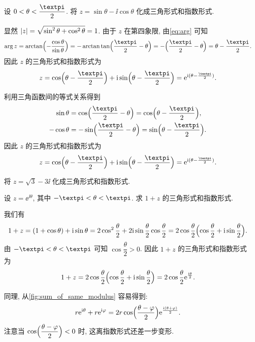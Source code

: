 \begin{example}
  设 $0<\theta<\dfrac\cpi2$.
  将 $z=\sin\theta-\ii\cos\theta$ 化成三角形式和指数形式.
\end{example}

\begin{solution}[解法一]
  显然 $\lvert z\rvert=\sqrt{\sin^2\theta+\cos^2\theta}=1$. 由于 $z$ 在第四象限, 由\eqref{eq:arg} 可知
  \[
     \arg z
    =\arctan\Bigl(-\frac{\cos\theta}{\sin\theta}\Bigr)
    =-\arctan\tan\Bigl(\frac\cpi2-\theta\Bigr)
    =-\Bigl(\frac\cpi2-\theta\Bigr)
    =\theta-\frac\cpi2.
  \]
  因此 $z$ 的三角形式和指数形式为
  \[
     z
    =\cos\Bigl(\theta-\frac\cpi2\Bigr)+\ii\sin\Bigl(\theta-\frac\cpi2\Bigr)
    =\ee^{\ii(\theta-\frac\cpi2)}.
  \]
\end{solution}

\begin{solution}[解法二]
  利用三角函数间的等式关系得到
  \begin{align*}
      \sin\theta
    &=\cos\Bigl(\frac\cpi2-\theta\Bigr)
     =\cos\Bigl(\theta-\frac\cpi2\Bigr),\\
      -\cos\theta
    &=-\sin\Bigl(\frac\cpi2-\theta\Bigr)
     =\sin\Bigl(\theta-\frac\cpi2\Bigr).
  \end{align*}
  因此 $z$ 的三角形式和指数形式为
  \[
     z
    =\cos\Bigl(\theta-\frac\cpi2\Bigr)+\ii\sin\Bigl(\theta-\frac\cpi2\Bigr)
    =\ee^{\ii(\theta-\frac\cpi2)}.
  \]
\end{solution}

\begin{exercise}
  将 $z=\sqrt 3-3\ii$ 化成三角形式和指数形式.
\end{exercise}

\begin{example}
  设 $z=\ee^{\ii\theta}$, 其中 $-\cpi<\theta<\cpi$.
  求 $1+z$ 的三角形式和指数形式.
\end{example}
\begin{solution}
  我们有
  \[
     1+z
    =(1+\cos\theta)+\mathrm{i}\sin\theta
    =2\cos^2\frac\theta2+2\mathrm{i}\sin\frac\theta2\cos\frac\theta2
    =2\cos\frac\theta2\Bigl(\cos\frac\theta2+\mathrm{i}\sin\frac\theta2\Bigr).
  \]
  由 $-\cpi<\theta<\cpi$ 可知 $\cos\dfrac\theta2>0$.
  因此 $1+z$ 的三角形式和指数形式为
  \[
     1+z
    =2\cos\frac\theta2\Bigl(\cos\frac\theta2+\mathrm{i}\sin\frac\theta2\Bigr)
    =2\cos\frac\theta2\mathrm{e}^{\frac{\mathrm{i}\theta}2}.
  \]
\end{solution}

同理, 从\ref{fig:sum_of_same_modulus} 容易得到:
\begin{equation}
  \label{eq:sum-of-same-modulus}
   r\mathrm{e}^{\mathrm{i}\theta}+r\mathrm{e}^{\mathrm{i}\varphi}
  =2r\cos\Bigl(\frac{\theta-\varphi}2\Bigr)\mathrm{e}^{\frac{\mathrm{i}(\theta+\varphi)}2}.
\end{equation}
注意当 $\cos\Bigl(\dfrac{\theta-\varphi}2\Bigr)<0$ 时, 这离指数形式还差一步变形.

